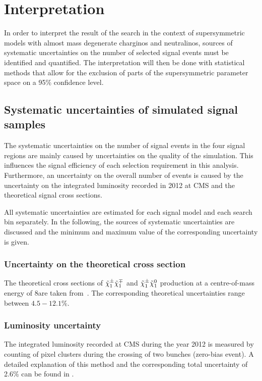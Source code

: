 \chapter{Interpretation}
\label{sec:Interpretation}
In order to interpret the result of the search in the context of supersymmetric models with almost mass degenerate charginos and neutralinos, sources of systematic uncertainties on the number of selected signal events must be identified and quantified.
The interpretation will then be done with statistical methods that allow for the exclusion of parts of the supersymmetric parameter space on a 95\% confidence level.

\section{Systematic uncertainties of simulated signal samples}
The systematic uncertainties on the number of signal events in the four signal regions are mainly caused by uncertainties on the quality of the simulation.
This influences the signal efficiency of each selection requirement in this analysis.
Furthermore, an uncertainty on the overall number of events is caused by the uncertainty on the integrated luminosity recorded in 2012 at CMS and the theoretical signal cross sections.

All systematic uncertainties are estimated for each signal model and each search bin separately.
In the following, the sources of systematic uncertainties are discussed and the minimum and maximum value of the corresponding uncertainty is given.

\subsection*{Uncertainty on the theoretical cross section}
The theoretical cross sections of $\tilde{\chi}^{\pm}_{1}\tilde{\chi}^{\mp}_{1}$ and $\tilde{\chi}^{\pm}_{1}\tilde{\chi}^{0}_{1}$ production at a centre-of-mass energy of 8\tev are taken from~\cite{bib:SignalCrossSection_2012,bib:SignalCrossSection_2013}.
The corresponding theoretical uncertainties range between $4.5-12.1\%$.

\subsection*{Luminosity uncertainty}
The integrated luminosity recorded at CMS during the year 2012 is measured by counting of pixel clusters during the crossing of two bunches (zero-bias event).
A detailed explanation of this method and the corresponding total uncertainty of 2.6\% can be found in \cite{bib:CMS:Lumi_PAS}.


